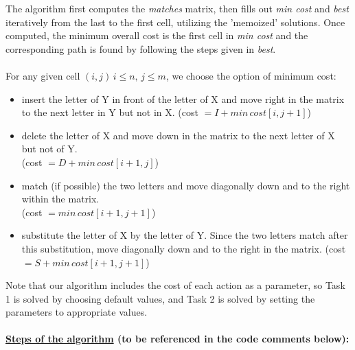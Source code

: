 \documentclass{article}
\begin{document}
\qquad The algorithm first computes the \textit{matches} matrix, then fills out \textit{min cost} and \textit{best} iteratively from the last to the first cell, utilizing the 'memoized' solutions.  Once computed, the minimum overall cost is the first cell in \textit{min cost} and the corresponding path is found by following the steps given in \textit{best}.
\\\\
For any given cell $(i, j) \, i \leq n, \, j \leq m $, we choose the option of minimum cost:
\begin{itemize}    
    	\item insert the letter of Y in front of the letter of X and move right in the matrix to the next letter in Y but not in X. (cost $= I + min \, cost[i, j+ 1]$) 
    	\item delete the letter of X and move down in the matrix to the next letter of X but not of Y. \\ (cost $= D + min\,cost[i+1, j]$)
	\item match (if possible) the two letters and move diagonally down and to the right within the matrix.	\\ (cost $= min\,cost[i+1, j+1]$)
    	\item substitute the letter of X by the letter of Y. Since the two letters match after this substitution, move diagonally down and to the right in the matrix.  (cost $= S + min\,cost[i+1, j+1]$)
\end{itemize}

Note that our algorithm includes the cost of each action as a parameter, so Task 1 is solved by choosing default values, and Task 2 is solved by setting the parameters to appropriate values.
\\\\
\textbf{\underline{Steps of the algorithm} (to be referenced in the code comments below):}
\end{document}
